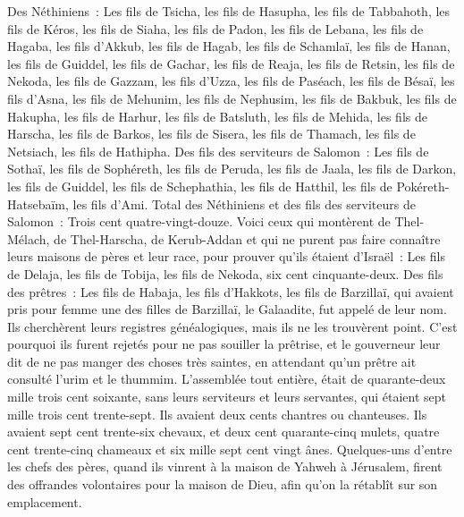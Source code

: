 \begin{multicols}{2}
Des Néthiniens~: Les fils de Tsicha, les fils de Hasupha, les fils de Tabbahoth,
les fils de Kéros, les fils de Siaha, les fils de Padon,
les fils de Lebana, les fils de Hagaba, les fils d'Akkub,
les fils de Hagab, les fils de Schamlaï, les fils de Hanan,
les fils de Guiddel, les fils de Gachar, les fils de Reaja,
les fils de Retsin, les fils de Nekoda, les fils de Gazzam,
les fils d'Uzza, les fils de Paséach, les fils de Bésaï,
les fils d'Asna, les fils de Mehunim, les fils de Nephusim,
les fils de Bakbuk, les fils de Hakupha, les fils de Harhur,
les fils de Batsluth, les fils de Mehida, les fils de Harscha,
les fils de Barkos, les fils de Sisera, les fils de Thamach,
les fils de Netsiach, les fils de Hathipha.
Des fils des serviteurs de Salomon~: Les fils de Sothaï, les fils de Sophéreth, les fils de Peruda,
les fils de Jaala, les fils de Darkon, les fils de Guiddel,
les fils de Schephathia, les fils de Hatthil, les fils de Pokéreth-Hatsebaïm, les fils d'Ami.
Total des Néthiniens et des fils des serviteurs de Salomon~: Trois cent quatre-vingt-douze.
Voici ceux qui montèrent de Thel-Mélach, de Thel-Harscha, de Kerub-Addan et qui ne purent pas faire connaître leurs maisons de pères et leur race, pour prouver qu'ils étaient d'Israël~:
Les fils de Delaja, les fils de Tobija, les fils de Nekoda, six cent cinquante-deux.
Des fils des prêtres~: Les fils de Habaja, les fils d'Hakkots, les fils de Barzillaï, qui avaient pris pour femme une des filles de Barzillaï, le Galaadite, fut appelé de leur nom.
Ils cherchèrent leurs registres généalogiques, mais ils ne les trouvèrent point. C'est pourquoi ils furent rejetés pour ne pas souiller la prêtrise,
et le gouverneur leur dit de ne pas manger des choses très saintes, en attendant qu'un prêtre ait consulté l'urim et le thummim.
L'assemblée tout entière, était de quarante-deux mille trois cent soixante,
sans leurs serviteurs et leurs servantes, qui étaient sept mille trois cent trente-sept. Ils avaient deux cents chantres ou chanteuses.
Ils avaient sept cent trente-six chevaux, et deux cent quarante-cinq mulets,
quatre cent trente-cinq chameaux et six mille sept cent vingt ânes.
Quelques-uns d'entre les chefs des pères, quand ils vinrent à la maison de Yahweh à Jérusalem, firent des offrandes volontaires pour la maison de Dieu, afin qu'on la rétablît sur son emplacement.

\end{multicols}
